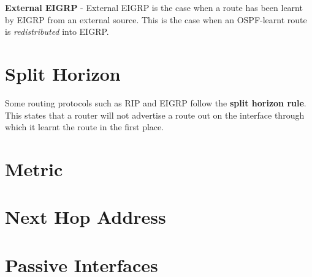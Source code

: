 \noindent
\textbf{External EIGRP} - External EIGRP is the case when a route has been learnt by EIGRP from an external source. This is the case when an OSPF-learnt route is \textit{redistributed} into EIGRP. 

\section{Split Horizon}
Some routing protocols such as RIP and EIGRP follow the \textbf{split horizon rule}. This states that a router will not advertise a route out on the interface through which it learnt the route in the first place. 

\section{Metric}


\section{Next Hop Address}


\section{Passive Interfaces}